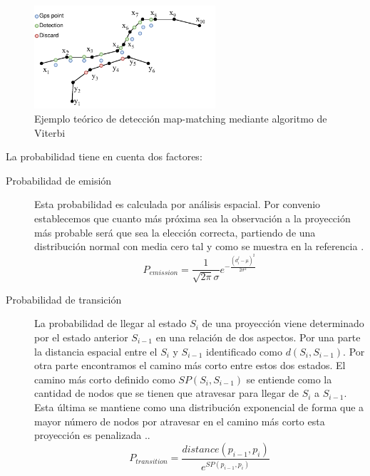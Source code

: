 \begin{figure}[htb]
\begin{center}
\includegraphics[width=0.6\textwidth]{./Imagenes/Map-matching}
\caption{Ejemplo teórico de detección map-matching mediante algoritmo de Viterbi}
\label{figure: MapMatching}
\end{center}
\end{figure}
\newpage

La probabilidad tiene en cuenta dos factores:
\begin{description}
\item [Probabilidad de emisión] Esta probabilidad es calculada por análisis espacial. Por 
convenio establecemos que cuanto más próxima sea la observación a la proyección 
más probable será que sea la elección correcta, partiendo de una distribución normal 
con media cero tal y como se muestra en la referencia \cite{HMM01}.
\begin{equation}
P_{emission}=\frac{1}{\sqrt{2\pi}\sigma}e^{-\frac{(d_{i}^{j}-\mu)^{2}}{2\sigma^{2}}} 
\end{equation}

\item [Probabilidad de transición] La probabilidad de llegar al estado $S_{i}$ de una 
proyección viene determinado por el estado anterior $S_{i-1}$ en una relación de dos 
aspectos. 
Por una parte la distancia espacial entre el  $S_{i}$ y $S_{i-1}$ identificado como 
$d(S_{i},S_{i-1})$. 
Por otra parte encontramos el camino más corto entre estos dos estados. El camino 
más corto definido como $SP(S_{i},S_{i-1})$ se entiende como la cantidad de nodos 
que se tienen que atravesar para llegar de  $S_{i}$ a $S_{i-1}$. Esta última se mantiene 
como una distribución exponencial de forma que a mayor número de nodos por 
atravesar en el camino más corto esta proyección es penalizada \cite{HMM01}..
\begin{equation} 
P_{transition}=\frac{distance(p_{i-1}, p_{i})}{e^{SP(p_{i-1}, p_{i})}}
\end{equation}
\end{description}

